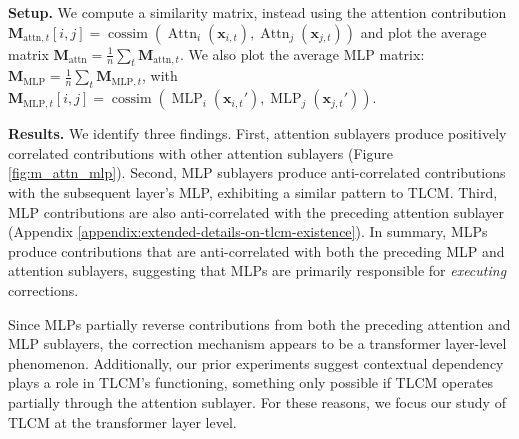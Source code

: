 
\textbf{Setup.} We compute a similarity matrix, instead using the attention contribution $\mathbf{M}_{\text{attn}, t}[i, j] = \operatorname{cossim}(\operatorname{Attn}_i(\mathbf{x}_{i, t}), \operatorname{Attn}_j(\mathbf{x}_{j, t}))$ and plot the average matrix $\mathbf{M}_\text{attn} = \frac{1}{n}\sum_t \mathbf{M}_{\text{attn}, t}$. We also plot the average MLP matrix: $\mathbf{M}_\text{MLP} = \frac{1}{n}\sum_t \mathbf{M}_{\text{MLP}, t}$, with $\mathbf{M}_{\text{MLP}, t}[i, j] = \operatorname{cossim}(\operatorname{MLP}_i(\mathbf{x}_{i, t}'), \operatorname{MLP}_j(\mathbf{x}_{j, t}'))$.

\textbf{Results.} We identify three findings. First, attention sublayers produce positively correlated contributions with other attention sublayers (Figure \ref{fig:m_attn_mlp}). Second, MLP sublayers produce anti-correlated contributions with the subsequent layer's MLP, exhibiting a similar pattern to TLCM. Third, MLP contributions are also anti-correlated with the preceding attention sublayer (Appendix \ref{appendix:extended-details-on-tlcm-existence}). In summary, MLPs produce contributions that are anti-correlated with both the preceding MLP and attention sublayers, suggesting that MLPs are primarily responsible for \textit{executing} corrections.

Since MLPs partially reverse contributions from both the preceding attention and MLP sublayers, the correction mechanism appears to be a transformer layer-level phenomenon. Additionally, our prior experiments suggest contextual dependency plays a role in TLCM's functioning, something only possible if TLCM operates partially through the attention sublayer. For these reasons, we focus our study of TLCM at the transformer layer level.


